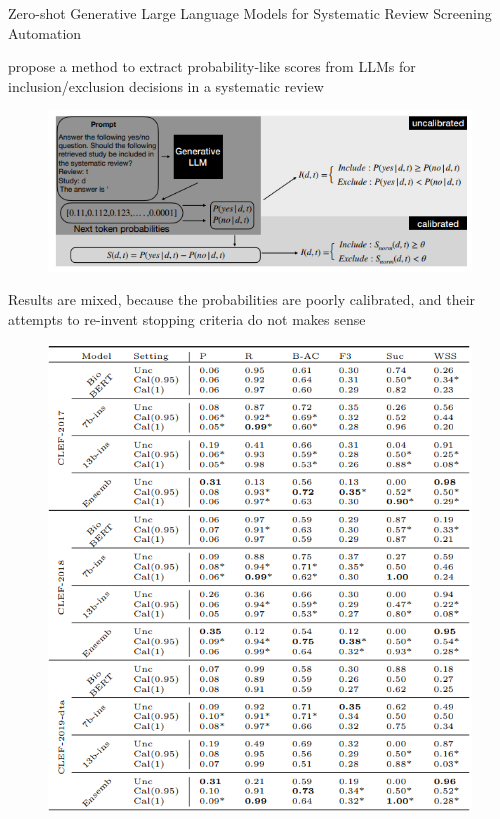 \documentclass[9pt,aspectratio=169]{beamer}
\begin{document}
\begin{frame}{Zero-shot Generative Large Language Models for Systematic Review Screening Automation}
	
	\cite{wang_zero-shot_2024} propose a method to extract probability-like scores from LLMs for inclusion/exclusion decisions in a systematic review
	
	\begin{figure}
		\includegraphics[width=\columnwidth]{images/fig1}
	\end{figure}
\end{frame}

\begin{frame}{Results are mixed, because the probabilities are poorly calibrated, and their attempts to re-invent stopping criteria do not makes sense}
	
	
	
	\begin{figure}
		\includegraphics[width=0.8\columnwidth]{images/tab3-1}
	\end{figure}
\end{frame}
\end{document}
